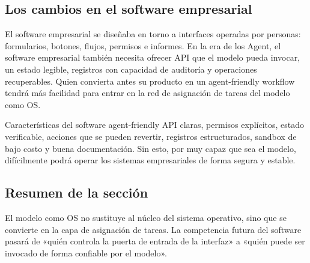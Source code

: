 \subsection{Los cambios en el software empresarial}

El software empresarial se diseñaba en torno a interfaces operadas por personas: formularios, botones, flujos, permisos e informes. En la era de los Agent, el software empresarial también necesita ofrecer API que el modelo pueda invocar, un estado legible, registros con capacidad de auditoría y operaciones recuperables. Quien convierta antes su producto en un agent-friendly workflow tendrá más facilidad para entrar en la red de asignación de tareas del modelo como OS.

\begin{importantbox}{Características del software agent-friendly}
API claras, permisos explícitos, estado verificable, acciones que se pueden revertir, registros estructurados, sandbox de bajo costo y buena documentación. Sin esto, por muy capaz que sea el modelo, difícilmente podrá operar los sistemas empresariales de forma segura y estable.
\end{importantbox}

\subsection{Resumen de la sección}

El modelo como OS no sustituye al núcleo del sistema operativo, sino que se convierte en la capa de asignación de tareas. La competencia futura del software pasará de «quién controla la puerta de entrada de la interfaz» a «quién puede ser invocado de forma confiable por el modelo».
